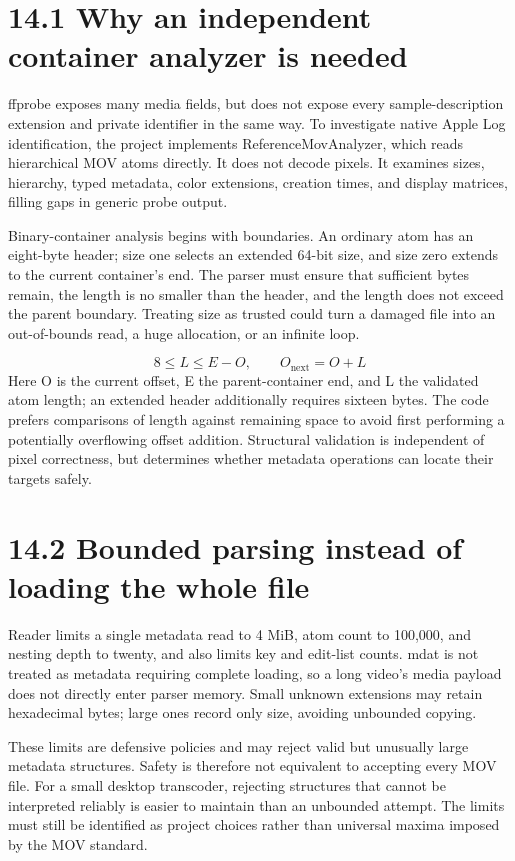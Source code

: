 \documentclass[11pt,a4paper,openany]{book}
\begin{document}
\section*{14.1 Why an independent container analyzer is needed}
ffprobe exposes many media fields, but does not expose every sample-description extension and private identifier in the same way. To investigate native Apple Log identification, the project implements ReferenceMovAnalyzer, which reads hierarchical MOV atoms directly. It does not decode pixels. It examines sizes, hierarchy, typed metadata, color extensions, creation times, and display matrices, filling gaps in generic probe output.

Binary-container analysis begins with boundaries. An ordinary atom has an eight-byte header; size one selects an extended 64-bit size, and size zero extends to the current container's end. The parser must ensure that sufficient bytes remain, the length is no smaller than the header, and the length does not exceed the parent boundary. Treating size as trusted could turn a damaged file into an out-of-bounds read, a huge allocation, or an infinite loop.


\begin{equation}
8\leq L\leq E-O,\qquad O_{\mathrm{next}}=O+L
\end{equation}
Here O is the current offset, E the parent-container end, and L the validated atom length; an extended header additionally requires sixteen bytes. The code prefers comparisons of length against remaining space to avoid first performing a potentially overflowing offset addition. Structural validation is independent of pixel correctness, but determines whether metadata operations can locate their targets safely.


\section*{14.2 Bounded parsing instead of loading the whole file}
Reader limits a single metadata read to 4 MiB, atom count to 100,000, and nesting depth to twenty, and also limits key and edit-list counts. mdat is not treated as metadata requiring complete loading, so a long video's media payload does not directly enter parser memory. Small unknown extensions may retain hexadecimal bytes; large ones record only size, avoiding unbounded copying.

These limits are defensive policies and may reject valid but unusually large metadata structures. Safety is therefore not equivalent to accepting every MOV file. For a small desktop transcoder, rejecting structures that cannot be interpreted reliably is easier to maintain than an unbounded attempt. The limits must still be identified as project choices rather than universal maxima imposed by the MOV standard.
\end{document}
